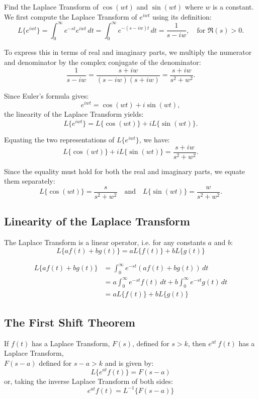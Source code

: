 \documentclass[a4paper, 10pt]{article}
\begin{document}
\begin{examplebox}{Find the Laplace Transform of $\cos(wt)$ and $\sin(wt)$ where $w$ is a constant.}{}
  We first compute the Laplace Transform of $e^{iwt}$ using its definition:
  \[
    L\{e^{iwt}\} = \int_0^\infty e^{-st}e^{iwt}\,dt
    = \int_0^\infty e^{-(s-iw)t}\,dt
    = \frac{1}{s-iw}, \quad \text{for } \Re(s) > 0.
  \]

  To express this in terms of real and imaginary parts, we multiply the numerator and denominator by the complex conjugate of the denominator:
  \[
    \frac{1}{s-iw} = \frac{s+iw}{(s-iw)(s+iw)} = \frac{s+iw}{s^2 + w^2}.
  \]

  Since Euler's formula gives:
  \[
    e^{iwt} = \cos(wt) + i\sin(wt),
  \]
  the linearity of the Laplace Transform yields:
  \[
    L\{e^{iwt}\} = L\{\cos(wt)\} + iL\{\sin(wt)\}.
  \]

  Equating the two representations of $L\{e^{iwt}\}$, we have:
  \[
    L\{\cos(wt)\} + iL\{\sin(wt)\} = \frac{s+iw}{s^2+w^2}.
  \]

  Since the equality must hold for both the real and imaginary parts, we equate them separately:
  \[
    L\{\cos(wt)\} = \frac{s}{s^2+w^2} \quad \text{and} \quad L\{\sin(wt)\} = \frac{w}{s^2+w^2}.
  \]
\end{examplebox}

\subsection{Linearity of the Laplace Transform}
The Laplace Transform is a linear operator, i.e. for any constants $a$ and $b$:
$$L\{af(t) + bg(t)\} = aL\{f(t)\} + bL\{g(t)\}$$
\begin{proofbox}
  \begin{align*}
    L\{af(t) + bg(t)\}
     & = \int_0^\infty e^{-st}(af(t) + bg(t))\, dt                         \\
     & = a\int_0^\infty e^{-st}f(t)\, dt + b\int_0^\infty e^{-st}g(t)\, dt \\
     & = aL\{f(t)\} + bL\{g(t)\}
  \end{align*}
\end{proofbox}

\subsection{The First Shift Theorem}
\begin{theorembox}
  If $f(t)$ has a Laplace Transform, $F(s)$, defined for $s > k$, then $e^{at}\ f(t)$ has a Laplace Transform, \\ $F(s-a)$ defined for $s - a > k$ and is given by:
  $$L\{e^{at} f(t)\} = F(s-a)$$
  or, taking the inverse Laplace Transform of both sides:
  $$e^{at}f(t) = L^{-1}\{F(s-a)\}$$
\end{theorembox}
\end{document}
